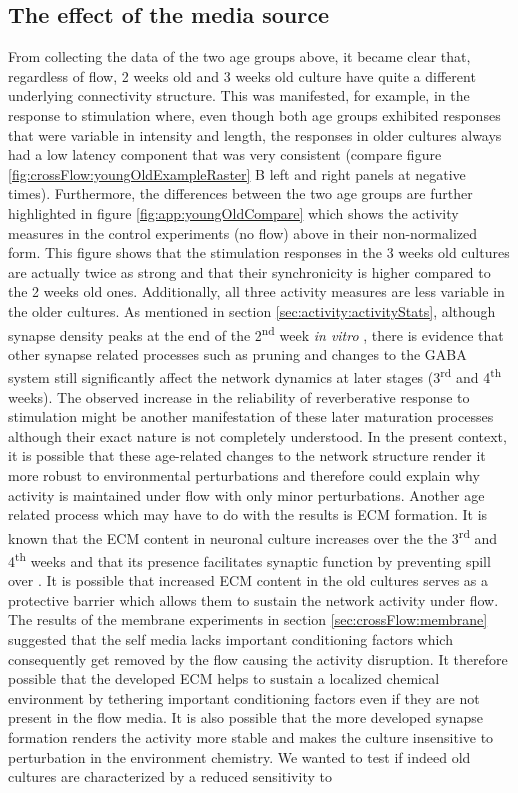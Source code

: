         \subsection{The effect of the media source}
        \label{sec:crossFlow:mismatch}
        From collecting the data of the two age groups above, it became clear that, regardless of flow, 2 weeks old and 3 weeks old culture have quite a different underlying connectivity structure. This was manifested, for example, in the response to stimulation where, even though both age groups exhibited responses that were variable in intensity and length, the responses in older cultures always had a low latency component that was very consistent (compare figure \ref{fig:crossFlow:youngOldExampleRaster} B left and right panels at negative times). Furthermore, the differences between the two age groups are further highlighted in figure \ref{fig:app:youngOldCompare} which shows the activity measures in the control experiments (no flow) above in their non-normalized form. This figure shows that the stimulation responses in the 3 weeks old cultures are actually twice as strong and that their synchronicity is higher compared to the 2 weeks old ones. Additionally, all three activity measures are less variable in the older cultures. As mentioned in section \ref{sec:activity:activityStats}, although synapse density peaks at the end of the 2\textsuperscript{nd} week \textit{in vitro} \cite{li2003some}, there is evidence that other synapse related processes such as pruning and changes to the GABA system still significantly affect the network dynamics at later stages (3\textsuperscript{rd} and 4\textsuperscript{th} weeks). The observed increase in the reliability of reverberative response to stimulation might be another manifestation of these later maturation processes although their exact nature is not completely understood. In the present context, it is possible that these age-related changes to the network structure render it more robust to environmental perturbations and therefore could explain why activity is maintained under flow with only minor perturbations. Another age related process which may have to do with the results is ECM formation. It is known that the ECM content in neuronal culture increases over the the 3\textsuperscript{rd} and 4\textsuperscript{th} weeks and that its presence facilitates synaptic function by preventing spill over \cite{bikbaev2015brain}. It is possible  that increased ECM content in the old cultures serves as a protective barrier which allows them to sustain the network activity under flow. The results of the membrane experiments in section \ref{sec:crossFlow:membrane} suggested that the self media lacks important conditioning factors which consequently get removed by the flow causing the activity disruption. It therefore possible that the developed ECM helps to sustain a localized chemical environment by tethering important conditioning factors even if they are not present in the flow media. It is also possible that the more developed synapse formation renders the activity more stable and makes the culture insensitive to perturbation in the environment chemistry. We wanted to test if indeed old cultures are characterized by a reduced sensitivity to 